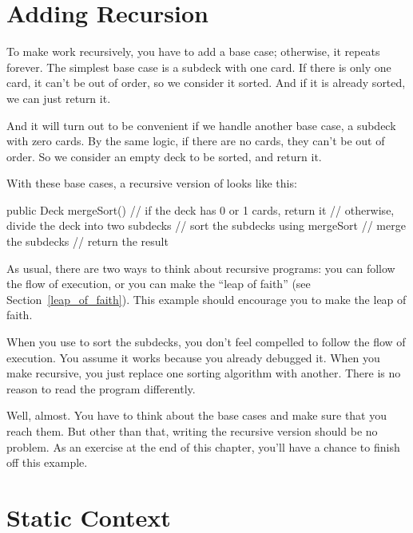 \section{Adding Recursion}

To make  work recursively, you have to add a base case; otherwise, it repeats forever.
The simplest base case is a subdeck with one card.
If there is only one card, it can't be out of order, so we consider it sorted.
And if it is already sorted, we can just return it.

And it will turn out to be convenient if we handle another base case, a subdeck with zero cards.
By the same logic, if there are no cards, they can't be out of order.
So we consider an empty deck to be sorted, and return it.

With these base cases, a recursive version of  looks like this:

\begin{code}
public Deck mergeSort() {
    // if the deck has 0 or 1 cards, return it
    // otherwise, divide the deck into two subdecks
    // sort the subdecks using mergeSort
    // merge the subdecks
    // return the result
}
\end{code}


As usual, there are two ways to think about recursive programs: you can follow the flow of execution, or you can make the ``leap of faith'' (see Section~\ref{leap_of_faith}).
This example should encourage you to make the leap of faith.

When you use  to sort the subdecks, you don't feel compelled to follow the flow of execution.
You assume it works because you already debugged it.
When you make  recursive, you just replace one sorting algorithm with another.
There is no reason to read the program differently.

Well, almost.
You have to think about the base cases and make sure that you reach them.
But other than that, writing the recursive version should be no problem.
As an exercise at the end of this chapter, you'll have a chance to finish off this example.


\section{Static Context}

